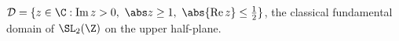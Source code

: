 $\mathcal D=\{z\in\C:\operatorname{Im}z>0,\ \abs z\ge1,\ \abs{\operatorname{Re}z}\le\tfrac12\}$, the classical fundamental domain of $\SL_2(\Z)$ on the upper half-plane.
